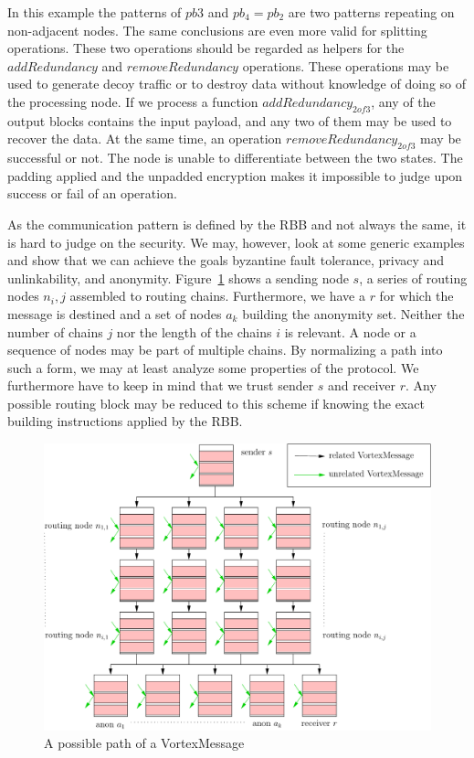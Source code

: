 In this example the patterns of $pb3$ and $pb_4=pb_2$ are two patterns repeating on non-adjacent nodes. The same conclusions are even more valid for splitting operations. These two operations should be regarded as helpers for the $addRedundancy$ and $removeRedundancy$ operations. These operations may be used to generate decoy traffic or to destroy data without knowledge of doing so of the processing node. If we process a function $addRedundancy_{2 of 3}$, any of the output blocks contains the input payload, and any two of them may be used to recover the data. At the same time, an operation $removeRedundancy_{2 of 3}$ may be successful or not. The node is unable to differentiate between the two states. The padding applied and the unpadded encryption makes it impossible to judge upon success or fail of an operation.

As the communication pattern is defined by the RBB and not always the same, it is hard to judge on the security. We may, however, look at some generic examples and show that we can achieve the goals byzantine fault tolerance, privacy and unlinkability, and anonymity. Figure~\ref{fig:messagePaths} shows a sending node $s$, a series of routing nodes $n_i,j$ assembled to routing chains. Furthermore, we have a $r$ for which the message is destined and a set of nodes $a_k$ building the anonymity set. Neither the number of chains $j$ nor the length of the chains $i$ is relevant. A node or a sequence of nodes may be part of multiple chains. By normalizing a path into such a form, we may at least analyze some properties of the protocol. We furthermore have to keep in mind that we trust sender $s$ and receiver $r$. Any possible routing block may be reduced to this scheme if knowing the exact building instructions applied by the RBB.

\begin{figure}[ht]
	\centering\includegraphics[width=0.7\columnwidth]{inc/messagePaths}
	\caption{A possible path of a VortexMessage}
	\label{fig:messagePaths}
\end{figure}

